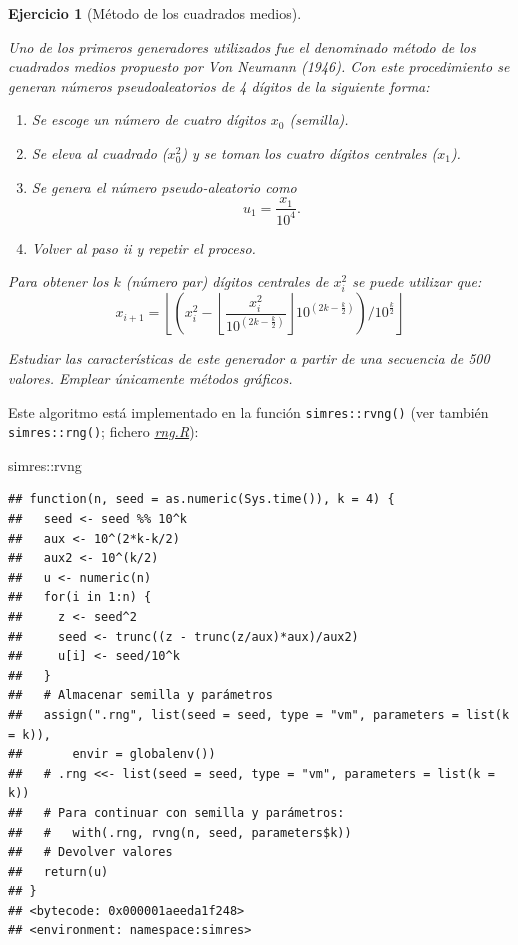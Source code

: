 \documentclass[
]{book}
\newenvironment{Shaded}{\begin{snugshade}}{\end{snugshade}}
\newcommand{\NormalTok}[1]{#1}
\newcommand{\SpecialCharTok}[1]{\textcolor[rgb]{0.00,0.00,0.00}{#1}}
\theoremstyle{break}
\newtheorem{exercise}{Ejercicio}[chapter]
\theoremstyle{nonumberplain}
\begin{document}
\begin{exercise}[Método de los cuadrados medios]
\protect\hypertarget{exr:RANDVN}{}\label{exr:RANDVN}

Uno de los primeros generadores utilizados fue el denominado método de los cuadrados medios propuesto por Von Neumann (1946).
Con este procedimiento se generan números pseudoaleatorios de 4 dígitos de la siguiente forma:

\begin{enumerate}
\def\labelenumi{\roman{enumi}.}
\item
  Se escoge un número de cuatro dígitos \(x_0\) (semilla).
\item
  Se eleva al cuadrado (\(x_0^2\)) y se toman los cuatro dígitos centrales (\(x_1\)).
\item
  Se genera el número pseudo-aleatorio como \[u_1=\frac{x_1}{10^{4}}.\]
\item
  Volver al paso ii y repetir el proceso.
\end{enumerate}

Para obtener los \(k\) (número par) dígitos centrales de \(x_{i}^2\)
se puede utilizar que:
\[x_{i+1}=\left\lfloor \left(  x_{i}^2-\left\lfloor \dfrac{x_{i}^2}{10^{(2k-\frac{k}2)}}\right\rfloor 10^{(2k-\frac{k}2)}\right)
/10^{\frac{k}2}\right\rfloor\]

Estudiar las características de este generador a partir de una secuencia de 500 valores.
Emplear únicamente métodos gráficos.
\end{exercise}

Este algoritmo está implementado en la función \texttt{simres::rvng()} (ver también \texttt{simres::rng()}; fichero \href{R/rng.R}{\emph{rng.R}}):

\begin{Shaded}
\begin{Highlighting}[]
\NormalTok{simres}\SpecialCharTok{::}\NormalTok{rvng}
\end{Highlighting}
\end{Shaded}

\begin{verbatim}
## function(n, seed = as.numeric(Sys.time()), k = 4) {
##   seed <- seed %% 10^k
##   aux <- 10^(2*k-k/2)
##   aux2 <- 10^(k/2)
##   u <- numeric(n)
##   for(i in 1:n) {
##     z <- seed^2
##     seed <- trunc((z - trunc(z/aux)*aux)/aux2)
##     u[i] <- seed/10^k
##   }
##   # Almacenar semilla y parámetros
##   assign(".rng", list(seed = seed, type = "vm", parameters = list(k = k)),
##       envir = globalenv())
##   # .rng <<- list(seed = seed, type = "vm", parameters = list(k = k))
##   # Para continuar con semilla y parámetros:
##   #   with(.rng, rvng(n, seed, parameters$k))
##   # Devolver valores
##   return(u)
## }
## <bytecode: 0x000001aeeda1f248>
## <environment: namespace:simres>
\end{verbatim}
\end{document}
